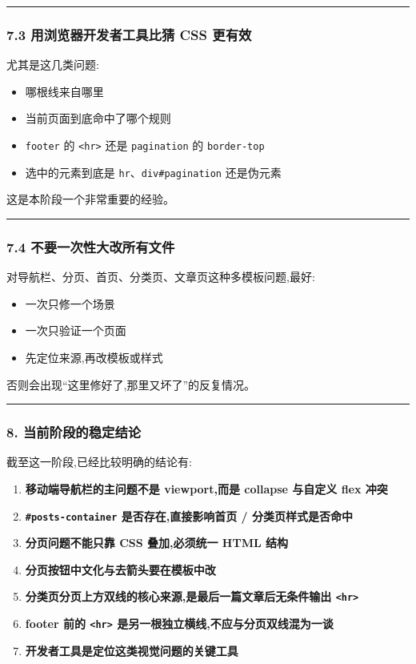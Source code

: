 \documentclass[lang=cn,scheme=chinese,color=blue,device=normal,toc=onecol,math=cm]{elegantbook}
\begin{document}
\medskip\hrule\medskip


\subsubsection{7.3 用浏览器开发者工具比猜 CSS 更有效}


尤其是这几类问题:\par


\begin{itemize}
\item 哪根线来自哪里
\item 当前页面到底命中了哪个规则
\item \texttt{footer} 的 \texttt{<hr>} 还是 \texttt{pagination} 的 \texttt{border-top}
\item 选中的元素到底是 \texttt{hr}、\texttt{div\#pagination} 还是伪元素
\end{itemize}


这是本阶段一个非常重要的经验。\par


\medskip\hrule\medskip


\subsubsection{7.4 不要一次性大改所有文件}


对导航栏、分页、首页、分类页、文章页这种多模板问题,最好:\par


\begin{itemize}
\item 一次只修一个场景
\item 一次只验证一个页面
\item 先定位来源,再改模板或样式
\end{itemize}


否则会出现“这里修好了,那里又坏了”的反复情况。\par


\medskip\hrule\medskip


\subsubsection{8. 当前阶段的稳定结论}


截至这一阶段,已经比较明确的结论有:\par


\begin{enumerate}
\item \textbf{移动端导航栏的主问题不是 viewport,而是 collapse 与自定义 flex 冲突}
\item \textbf{\texttt{\#posts-container} 是否存在,直接影响首页 /\allowbreak{} 分类页样式是否命中}
\item \textbf{分页问题不能只靠 CSS 叠加,必须统一 HTML 结构}
\item \textbf{分页按钮中文化与去箭头要在模板中改}
\item \textbf{分类页分页上方双线的核心来源,是最后一篇文章后无条件输出 \texttt{<hr>}}
\item \textbf{footer 前的 \texttt{<hr>} 是另一根独立横线,不应与分页双线混为一谈}
\item \textbf{开发者工具是定位这类视觉问题的关键工具}
\end{enumerate}
\end{document}
